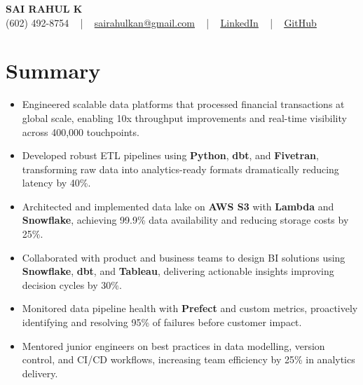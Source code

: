 \documentclass[letterpaper,11pt]{article}
\newcommand{\resumeItem}[1]{
  \item\footnotesize{
    {#1 \vspace{-2pt}}
  }
}
\newcommand{\resumeItemListStart}{\begin{itemize}[leftmargin=*]}
\newcommand{\resumeItemListEnd}{\end{itemize}\vspace{-5pt}}
\begin{document}
\begin{center}
    {\fontsize{14pt}{12pt}\selectfont \textbf{\MakeUppercase{Sai Rahul K}}}\\ \vspace{2pt}
    \fontsize{10pt}{12pt}\selectfont (602) 492-8754 ~ | ~ \href{mailto:sairahulkan@gmail.com}{sairahulkan@gmail.com} ~ | ~
    \href{https://www.linkedin.com/in/rq123/}{\color{blue}\underline{LinkedIn}} ~ | ~
    \href{https://github.com/kanrahuldo}{\color{blue}\underline{GitHub}}~
    \vspace{-8pt}
\end{center}

\section{Summary}
\fontsize{9pt}{10pt}\selectfont
\resumeItemListStart
    \resumeItem{Engineered scalable data platforms that processed financial transactions at global scale, enabling 10x throughput improvements and real-time visibility across 400,000 touchpoints.}
    \resumeItem{Developed robust ETL pipelines using \textbf{Python}, \textbf{dbt}, and \textbf{Fivetran}, transforming raw data into analytics-ready formats dramatically reducing latency by 40\%.}
    \resumeItem{Architected and implemented data lake on \textbf{AWS S3} with \textbf{Lambda} and \textbf{Snowflake}, achieving 99.9\% data availability and reducing storage costs by 25\%.}
    \resumeItem{Collaborated with product and business teams to design BI solutions using \textbf{Snowflake}, \textbf{dbt}, and \textbf{Tableau}, delivering actionable insights improving decision cycles by 30\%.}
    \resumeItem{Monitored data pipeline health with \textbf{Prefect} and custom metrics, proactively identifying and resolving 95\% of failures before customer impact.}
    \resumeItem{Mentored junior engineers on best practices in data modelling, version control, and CI/CD workflows, increasing team efficiency by 25\% in analytics delivery.}
\resumeItemListEnd
\vspace{-6pt}
\end{document}
